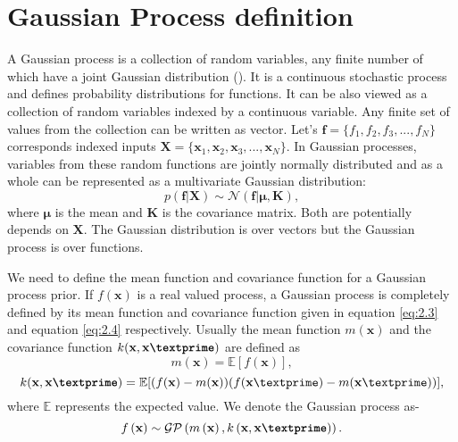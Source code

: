 
\section{Gaussian Process definition}
A Gaussian process is a collection of random variables, any finite number of which have a joint Gaussian distribution (\cite{Rasmussen_and_Williams:2006}). It is a continuous stochastic process and defines probability distributions for functions. It can be also viewed as a collection of random variables indexed by a continuous variable. Any finite set of values from the collection can be written as vector. Let's $ \textbf{f} = \{ f_1, f_2, f_3,..., f_N\}$ corresponds indexed inputs $ \textbf{X} = \{ \textbf{x}_1, \textbf{x}_2, \textbf{x}_3,..., \textbf{x}_N\}$. In Gaussian processes, variables from these random functions are jointly normally distributed and as a whole can be represented as a multivariate Gaussian distribution:
\begin{equation} \label{eq:2.2}
p(\textbf{f}|\textbf{X})\sim \mathcal{N}\left(\textbf{f}|\boldsymbol\mu,\textbf{K}\right),
\end{equation}
where $\boldsymbol\mu$ is the mean and $\textbf{K}$ is the covariance matrix. Both are potentially depends on $\textbf{X}$. The Gaussian distribution is over vectors but the Gaussian process is over functions.

We need to define the mean function and covariance function for a Gaussian process prior. If $f(\textbf{x})$ is a real valued process, a Gaussian process is completely defined by its mean function and covariance function given in equation \ref{eq:2.3} and equation \ref{eq:2.4} respectively. Usually the mean function $m(\textbf{x})$  and the covariance function $k(\textbf{x},\textbf{x\textprime})$ are defined as
\begin{equation} \label{eq:2.3}
m(\textbf{x})= \mathbb{E}[f(\textbf{x})],
\end{equation}
\begin{equation} \label{eq:2.4}
k(\textbf{x},\textbf{x\textprime})= 
\mathbb{E}[(f(\textbf{x})-m(\textbf{x}))(f(\textbf{x}\textprime)-m(\textbf{x}\textprime))],
\end{equation}
where $\mathbb{E}$ represents the expected value. We denote the Gaussian process as-
\begin{equation} \label{eq:GP}
f\left(\textbf{x} \right)\sim \mathcal{GP} \left(m \left(\textbf{x}\right), k \left(\textbf{x},\textbf{x\textprime}\right) \right).
\end{equation}

